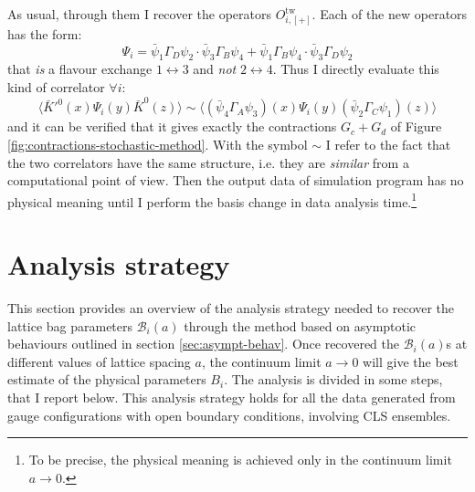 \documentclass[english, LaM, oneside, noexaminfo]{sapthesis}
\begin{document}
As usual, through them I recover the operators $O_{i,[+]}^\text{tw}$.
Each of the new operators has the form:
$$\Psi_i = \bar\psi_1 \Gamma_D \psi_2 \cdot \bar\psi_3 \Gamma_B \psi_4 + \bar\psi_1 \Gamma_B \psi_4 \cdot \bar\psi_3 \Gamma_D \psi_2$$
that {\it is} a flavour exchange $1 \leftrightarrow 3$ and {\it not} $2 \leftrightarrow 4$.
Thus I directly evaluate this kind of correlator $\forall i$:
$$\bigg\langle \bar K'^0(x) \Psi_i (y) \bar K^0(z) \bigg\rangle \sim \bigg\langle \left(\bar\psi_4 \Gamma_A \psi_3 \right) (x) \Psi_i (y) \left(\bar\psi_2 \Gamma_C \psi_1 \right) (z) \bigg\rangle$$
and it can be verified that it gives exactly the contractions $G_c + G_d$ of Figure \ref{fig:contractions-stochastic-method}.
With the symbol $\sim$ I refer to the fact that the two correlators have the same structure, i.e. they are {\it similar} from a computational point of view.
Then the output data of simulation program has no physical meaning until I perform the basis change in data analysis time.\footnote{To be precise, the physical meaning is achieved only in the continuum limit $a \rightarrow 0$.}

\section{Analysis strategy}\label{sec:analysis}
\noindent
This section provides an overview of the analysis strategy needed to recover the lattice bag parameters $\mathcal{B}_i (a)$ through the method based on asymptotic behaviours outlined in section \ref{sec:asympt-behav}.
Once recovered the $\mathcal{B}_i (a)$s at different values of lattice spacing $a$, the continuum limit $a\rightarrow 0$ will give the best estimate of the physical parameters $B_i$.
The analysis is divided in some steps, that I report below.
This analysis strategy holds for all the data generated from gauge configurations with open boundary conditions, involving CLS ensembles.
\end{document}
